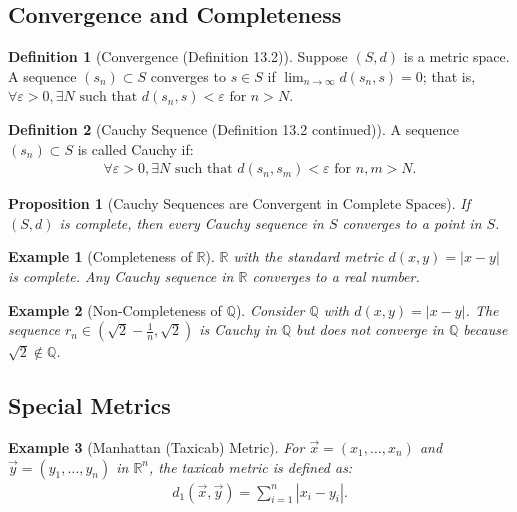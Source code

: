 \documentclass[9pt]{article}
\theoremstyle{definition}
\newtheorem{definition}{Definition}
\theoremstyle{plain}
\newtheorem{proposition}{Proposition}
\newtheorem{example}{Example}
\begin{document}
\subsection*{Convergence and Completeness}
\begin{definition}[Convergence (Definition 13.2)]
Suppose $ (S, d) $ is a metric space. A sequence $ (s_n) \subset S $ converges to $ s \in S $ if $ \lim_{n \to \infty} d(s_n, s) = 0 $; that is, $ \forall \varepsilon > 0, \exists N \text{ such that } d(s_n, s) < \varepsilon \text{ for } n > N $.
\end{definition}

\begin{definition}[Cauchy Sequence (Definition 13.2 continued)]
A sequence $ (s_n) \subset S $ is called Cauchy if:
\begin{align}
\forall \varepsilon > 0, \exists N \text{ such that } d(s_n, s_m) < \varepsilon \text{ for } n, m > N.
\end{align}
\end{definition}

\begin{proposition}[Cauchy Sequences are Convergent in Complete Spaces]
If $ (S, d) $ is complete, then every Cauchy sequence in $ S $ converges to a point in $ S $.
\end{proposition}

\begin{example}[Completeness of $ \mathbb{R} $]
$ \mathbb{R} $ with the standard metric $ d(x, y) = |x - y| $ is complete. Any Cauchy sequence in $ \mathbb{R} $ converges to a real number.
\end{example}

\begin{example}[Non-Completeness of $ \mathbb{Q} $]
Consider $ \mathbb{Q} $ with $ d(x, y) = |x - y| $. The sequence $ r_n \in (\sqrt{2} - \frac{1}{n}, \sqrt{2}) $ is Cauchy in $ \mathbb{Q} $ but does not converge in $ \mathbb{Q} $ because $ \sqrt{2} \notin \mathbb{Q} $.
\end{example}

\subsection*{Special Metrics}
\begin{example}[Manhattan (Taxicab) Metric]
For $ \vec{x} = (x_1, \ldots, x_n) $ and $ \vec{y} = (y_1, \ldots, y_n) $ in $ \mathbb{R}^n $, the taxicab metric is defined as:
\begin{align}
d_1(\vec{x}, \vec{y}) = \sum_{i=1}^n |x_i - y_i|.
\end{align}
\end{example}
\end{document}
